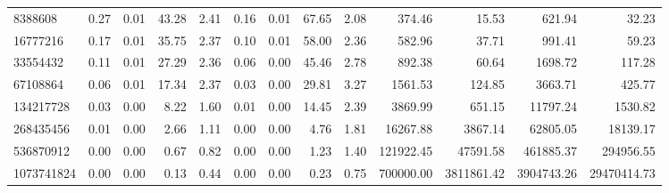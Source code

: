 \begin{tabular}{lrrrrrrrrrrrr}
8388608 & 0.27 & 0.01 & 43.28 & 2.41 & 0.16 & 0.01 & 67.65 & 2.08 & 374.46 & 15.53 & 621.94 & 32.23 \\
16777216 & 0.17 & 0.01 & 35.75 & 2.37 & 0.10 & 0.01 & 58.00 & 2.36 & 582.96 & 37.71 & 991.41 & 59.23 \\
33554432 & 0.11 & 0.01 & 27.29 & 2.36 & 0.06 & 0.00 & 45.46 & 2.78 & 892.38 & 60.64 & 1698.72 & 117.28 \\
67108864 & 0.06 & 0.01 & 17.34 & 2.37 & 0.03 & 0.00 & 29.81 & 3.27 & 1561.53 & 124.85 & 3663.71 & 425.77 \\
134217728 & 0.03 & 0.00 & 8.22 & 1.60 & 0.01 & 0.00 & 14.45 & 2.39 & 3869.99 & 651.15 & 11797.24 & 1530.82 \\
268435456 & 0.01 & 0.00 & 2.66 & 1.11 & 0.00 & 0.00 & 4.76 & 1.81 & 16267.88 & 3867.14 & 62805.05 & 18139.17 \\
536870912 & 0.00 & 0.00 & 0.67 & 0.82 & 0.00 & 0.00 & 1.23 & 1.40 & 121922.45 & 47591.58 & 461885.37 & 294956.55 \\
1073741824 & 0.00 & 0.00 & 0.13 & 0.44 & 0.00 & 0.00 & 0.23 & 0.75 & 700000.00 & 3811861.42 & 3904743.26 & 29470414.73 \\
\bottomrule
\end{tabular}
